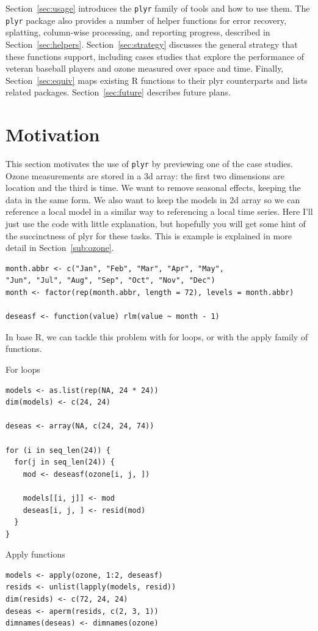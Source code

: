 \documentclass[letterpage]{scrartcl}
\newcommand{\plyr}{{\tt plyr}\xspace}
\begin{document}
Section~\ref{sec:usage} introduces the {\tt plyr} family of tools and how to use them.  The {\tt plyr} package also provides a number of helper functions for error recovery, splatting, column-wise processing, and reporting progress,  described in Section~\ref{sec:helpers}. Section~\ref{sec:strategy} discusses the general strategy that these functions support, including cases studies that explore the performance of veteran baseball players and ozone measured over space and time.  Finally, Section~\ref{sec:equiv} maps existing R functions to their plyr counterparts and lists related packages.  Section~\ref{sec:future} describes future plans.

\section{Motivation}
\label{sec:motivation}

This section motivates the use of \plyr by previewing one of the case studies. Ozone measurements are stored in a 3d array: the first two dimensions are location and the third is time.  We want to remove seasonal effects, keeping the data in the same form.  We also want to keep the models in 2d array so we can reference a local model in a similar way to referencing a local time series.  Here I'll just use the code with little explanation, but hopefully you will get some hint of the succinctness of plyr for these tasks.  This is example is explained in more detail in Section~\ref{sub:ozone}.  

\begin{verbatim}
month.abbr <- c("Jan", "Feb", "Mar", "Apr", "May", 
"Jun", "Jul", "Aug", "Sep", "Oct", "Nov", "Dec")
month <- factor(rep(month.abbr, length = 72), levels = month.abbr)

deseasf <- function(value) rlm(value ~ month - 1)
\end{verbatim}

In base R, we can tackle this problem with for loops, or with the apply family of functions.  

\raggedcolumns
\begin{multicols}{2}

\noindent For loops
\begin{verbatim}
models <- as.list(rep(NA, 24 * 24))
dim(models) <- c(24, 24)

deseas <- array(NA, c(24, 24, 74))

for (i in seq_len(24)) {
  for(j in seq_len(24)) {
    mod <- deseasf(ozone[i, j, ])

    models[[i, j]] <- mod
    deseas[i, j, ] <- resid(mod)
  }
}

\end{verbatim}
\columnbreak

\noindent Apply functions
\begin{verbatim}
models <- apply(ozone, 1:2, deseasf)
resids <- unlist(lapply(models, resid))
dim(resids) <- c(72, 24, 24)
deseas <- aperm(resids, c(2, 3, 1))
dimnames(deseas) <- dimnames(ozone)
\end{verbatim}
\end{multicols}
\end{document}
